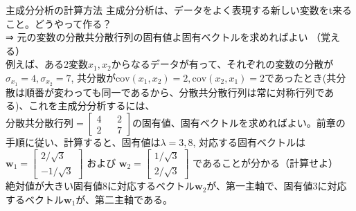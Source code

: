 \documentclass[dvipdfmx,autodetect-engine, unicode, 10pt, aspectratio=169]{beamer}
\begin{document}
\begin{frame}{主成分分析の計算方法}
    主成分分析は、データをよく表現する新しい変数をt来ること。どうやって作る？\\
    ⇒ 元の変数の分散共分散行列の固有値よ固有ベクトルを求めればよい （覚える）\\
    例えば、ある2変数$x_1, x_2$からなるデータが有って、それぞれの変数の分散が$\sigma_{x_1}=4, \sigma_{x_2}=7$, 共分散が$\text{cov}(x_1, x_2)=2, \text{cov}(x_2, x_1)=2$であったとき(共分散は順番が変わっても同一であるから、分散共分散行列は常に対称行列である)、これを主成分分析するには、\\
    $
        \text{分散共分散行列} = 
            \begin{bmatrix}
                4 && 2 \\
                2 && 7
            \end{bmatrix}
    $の固有値、固有ベクトルを求めればよい。前章の手順に従い、計算すると、固有値は$\lambda = 3, 8$, 対応する固有ベクトルは\\
    $\bm{w}_1 = \begin{bmatrix}
        2/\sqrt{3} \\ -1/\sqrt{3}
    \end{bmatrix}$
    および
    $\bm{w}_2 = \begin{bmatrix}
        1/\sqrt{3} \\ 2/\sqrt{3}
    \end{bmatrix}$
    であることが分かる（計算せよ）\\
    絶対値が大きい固有値8に対応するベクトル$\bm{w}_2$が、第一主軸で、固有値3に対応するベクトル$\bm{w}_1$が、第二主軸である。
\end{frame}
\end{document}
